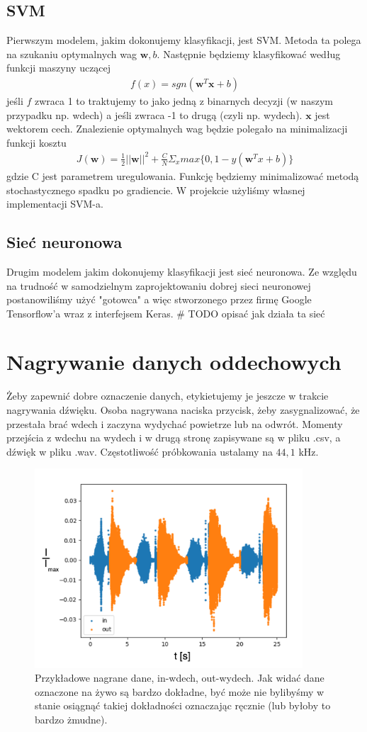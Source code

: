 \documentclass[polish]{article}
\begin{document}
\subsection{SVM}
Pierwszym modelem, jakim dokonujemy klasyfikacji, jest SVM. Metoda ta polega na szukaniu optymalnych wag $\boldsymbol{w}, b$.
Następnie będziemy klasyfikować według funkcji maszyny uczącej 
\begin{gather*}
	f(x) = sgn(\boldsymbol{w}^T \boldsymbol{x} + b)
\end{gather*}
jeśli $f$ zwraca 1 to traktujemy to jako jedną z binarnych decyzji (w naszym przypadku np. wdech) a jeśli zwraca -1 to drugą (czyli np. wydech).
$\textbf{x}$ jest wektorem cech.  Znalezienie optymalnych wag będzie polegało na minimalizacji
funkcji kosztu
\begin{gather*}
	J(\boldsymbol{w}) = \frac{1}{2}||\boldsymbol{w}||^2 + \frac{C}{N}\Sigma_x max\{0, 1 - y(\boldsymbol{w}^Tx + b)\}
\end{gather*}
gdzie C jest parametrem uregulowania. Funkcję będziemy minimalizować metodą stochastycznego spadku po gradiencie.
W projekcie użyliśmy własnej implementacji SVM-a.
\subsection{Sieć neuronowa}
Drugim modelem jakim dokonujemy klasyfikacji jest sieć neuronowa. Ze względu na trudność w samodzielnym zaprojektowaniu dobrej sieci neuronowej postanowiliśmy użyć "gotowca" a więc stworzonego przez firmę Google Tensorflow'a wraz z interfejsem Keras. \# TODO opisać jak działa ta sieć
\section{Nagrywanie danych oddechowych}
Żeby zapewnić dobre oznaczenie danych, etykietujemy je jeszcze w trakcie nagrywania dźwięku. 
Osoba nagrywana naciska przycisk, żeby zasygnalizować, że przestała brać wdech i zaczyna wydychać 
powietrze lub na odwrót. Momenty przejścia z wdechu na wydech i w drugą stronę zapisywane są w pliku
.csv, a dźwięk w pliku .wav. Częstotliwość próbkowania ustalamy na $44,1$ kHz.
\begin{figure}[H]
	\centering
	\includegraphics[width=10cm]{nagrywanie_ozn}
	\caption{Przykładowe nagrane dane, in-wdech, out-wydech. Jak widać dane oznaczone na żywo są bardzo dokładne, być może nie bylibyśmy w stanie osiągnąć takiej
dokładności oznaczając ręcznie (lub byłoby to bardzo żmudne).}
\end{figure}
\end{document}
